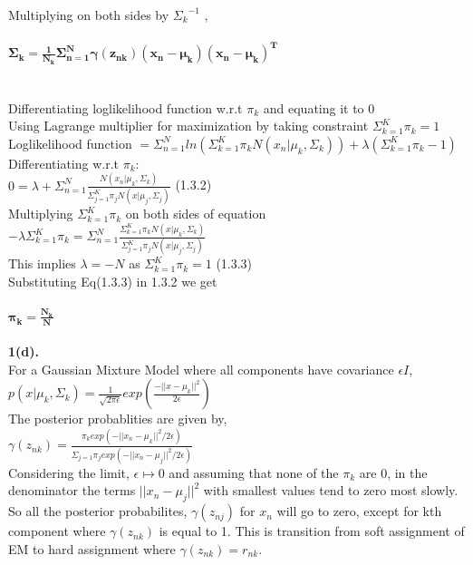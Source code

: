 \documentclass{article}
\begin{document}
\\Multiplying on both sides by ${\Sigma_k}^{-1}$ ,\\
\\$\mathbf{\Sigma_k=\frac{1}{N_k}\Sigma_{n=1}^N\gamma(z_{nk})(x_n-\mu_k)(x_n-\mu_k)^T} $\\
\\
\\Differentiating loglikelihood function w.r.t $\pi_k$ and equating it to 0\\
Using Lagrange multiplier for maximization by taking constraint $\Sigma_{k=1}^K \pi_k=1$\\
Loglikelihood function $= \Sigma_{n=1}^Nln(\Sigma_{k=1}^K\pi_kN(x_n|\mu_k,\Sigma_k)) + \lambda(\Sigma_{k=1}^K \pi_k-1) $\\
Differentiating w.r.t $\pi_k$:\\
$0=\lambda + \Sigma_{n=1}^N\frac{N(x_n|\mu_k,\Sigma_k)}{\Sigma_{j=1}^K\pi_j N(x|\mu_j,\Sigma_j)}$   (1.3.2)\\
Multiplying $\Sigma_{k=1}^K\pi_k$ on both sides of equation\\
$-\lambda\Sigma_{k=1}^K\pi_k=\Sigma_{n=1}^N\frac{\Sigma_{k=1}^K\pi_k N(x|\mu_k,\Sigma_k)}{\Sigma_{j=1}^K\pi_j N(x|\mu_j,\Sigma_j)}$\\
This implies $\lambda=-N$ as $\Sigma_{k=1}^{K}\pi_k=1$   (1.3.3)\\  
Substituting Eq(1.3.3) in 1.3.2 we get\\
\\$\mathbf{\pi_k=\frac{N_k}{N}}$\\
\\
\textbf{1(d).}\\
For a Gaussian Mixture Model where all components have covariance $\epsilon I$,\\
$p(x|\mu_k,\Sigma_k)=\frac{1}{\sqrt{2\pi\epsilon}}exp(\frac{-||x-\mu_k||^2}{2\epsilon})$\\
The posterior probablities are given by,\\
$\gamma(z_{nk})=\frac{\pi_k exp(-||x_n-\mu_k||^2/2\epsilon)}{\Sigma_{j=1}\pi_jexp(-||x_n-\mu_j||^2/2\epsilon)}$\\
Considering the limit, $\epsilon \mapsto 0$ and assuming that none of the $\pi_k$ are 0, in the denominator the terms $||x_n-\mu_j||^2$ with smallest values tend to zero most slowly. So all the posterior probabilites, $\gamma(z_{nj})$ for $x_n$ will go to zero, except for kth component where $\gamma(z_{nk})$ is equal to 1. This is transition from soft assignment of EM to hard assignment where $\gamma(z_{nk})=r_{nk}$.\\
\end{document}
